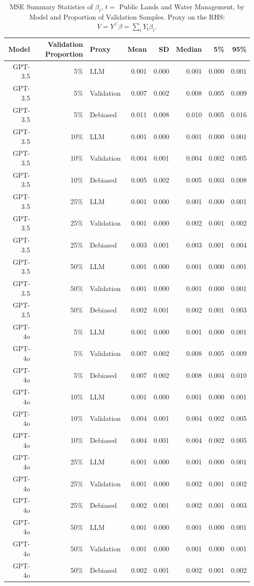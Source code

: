 \begin{table}

\caption{MSE Summary Statistics of $\beta_{t}$, $t=$ Public Lands and Water Management, by Model and Proportion of Validation Samples. Proxy on the RHS: $V = Y^\top \beta = \sum_{t} Y_t \beta_t$.}
\centering
\begin{tabular}[t]{rrlrrrrr}
\toprule
Model & Validation Proportion & Proxy & Mean & SD & Median & 5\% & 95\%\\
\midrule
GPT-3.5 & 5\% & LLM & 0.001 & 0.000 & 0.001 & 0.000 & 0.001\\
GPT-3.5 & 5\% & Validation & 0.007 & 0.002 & 0.008 & 0.005 & 0.009\\
GPT-3.5 & 5\% & Debiased & 0.011 & 0.008 & 0.010 & 0.005 & 0.016\\
GPT-3.5 & 10\% & LLM & 0.001 & 0.000 & 0.001 & 0.000 & 0.001\\
GPT-3.5 & 10\% & Validation & 0.004 & 0.001 & 0.004 & 0.002 & 0.005\\
GPT-3.5 & 10\% & Debiased & 0.005 & 0.002 & 0.005 & 0.003 & 0.008\\
GPT-3.5 & 25\% & LLM & 0.001 & 0.000 & 0.001 & 0.000 & 0.001\\
GPT-3.5 & 25\% & Validation & 0.001 & 0.000 & 0.002 & 0.001 & 0.002\\
GPT-3.5 & 25\% & Debiased & 0.003 & 0.001 & 0.003 & 0.001 & 0.004\\
GPT-3.5 & 50\% & LLM & 0.001 & 0.000 & 0.001 & 0.000 & 0.001\\
GPT-3.5 & 50\% & Validation & 0.001 & 0.000 & 0.001 & 0.000 & 0.001\\
GPT-3.5 & 50\% & Debiased & 0.002 & 0.001 & 0.002 & 0.001 & 0.003\\
GPT-4o & 5\% & LLM & 0.001 & 0.000 & 0.001 & 0.000 & 0.001\\
GPT-4o & 5\% & Validation & 0.007 & 0.002 & 0.008 & 0.005 & 0.009\\
GPT-4o & 5\% & Debiased & 0.007 & 0.002 & 0.008 & 0.004 & 0.010\\
GPT-4o & 10\% & LLM & 0.001 & 0.000 & 0.001 & 0.000 & 0.001\\
GPT-4o & 10\% & Validation & 0.004 & 0.001 & 0.004 & 0.002 & 0.005\\
GPT-4o & 10\% & Debiased & 0.004 & 0.001 & 0.004 & 0.002 & 0.005\\
GPT-4o & 25\% & LLM & 0.001 & 0.000 & 0.001 & 0.000 & 0.001\\
GPT-4o & 25\% & Validation & 0.001 & 0.000 & 0.002 & 0.001 & 0.002\\
GPT-4o & 25\% & Debiased & 0.002 & 0.001 & 0.002 & 0.001 & 0.003\\
GPT-4o & 50\% & LLM & 0.001 & 0.000 & 0.001 & 0.000 & 0.001\\
GPT-4o & 50\% & Validation & 0.001 & 0.000 & 0.001 & 0.000 & 0.001\\
GPT-4o & 50\% & Debiased & 0.002 & 0.001 & 0.002 & 0.001 & 0.002\\
\bottomrule
\end{tabular}
\end{table}
